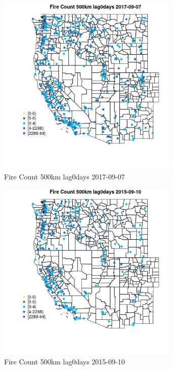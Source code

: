 \begin{figure} 
\centering  
\includegraphics[width=0.77\textwidth]{Code_Outputs/Report_ML_input_PM25_Step4_part_e_de_duplicated_aves_compiled_2019-05-21wNAs_MapObsFire_Count_500km_lag0days2017-09-07.jpg} 
\caption{\label{fig:Report_ML_input_PM25_Step4_part_e_de_duplicated_aves_compiled_2019-05-21wNAsMapObsFire_Count_500km_lag0days2017-09-07}Fire Count 500km lag0days 2017-09-07} 
\end{figure} 
 

\begin{figure} 
\centering  
\includegraphics[width=0.77\textwidth]{Code_Outputs/Report_ML_input_PM25_Step4_part_e_de_duplicated_aves_compiled_2019-05-21wNAs_MapObsFire_Count_500km_lag0days2015-09-10.jpg} 
\caption{\label{fig:Report_ML_input_PM25_Step4_part_e_de_duplicated_aves_compiled_2019-05-21wNAsMapObsFire_Count_500km_lag0days2015-09-10}Fire Count 500km lag0days 2015-09-10} 
\end{figure} 
 

